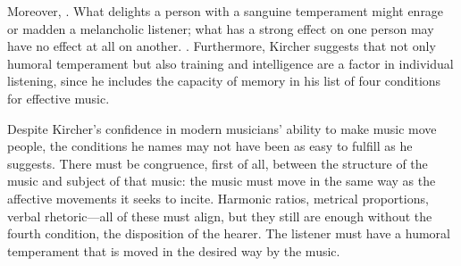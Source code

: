 Moreover, .
\Autocite[544: .]{Kircher:Musurgia}
What delights a person with a sanguine temperament might enrage or madden a melancholic listener; what has a strong effect on one person may have no effect at all on another.
\Autocite[550]{Kircher:Musurgia}
.
\Autocite[550: .]{Kircher:Musurgia}
Furthermore, Kircher suggests that not only humoral temperament but also training and intelligence are a factor in individual listening, since he includes the capacity of memory in his list of four conditions for effective music.

Despite Kircher's confidence in modern musicians' ability to make music move people, the conditions he names may not have been as easy to fulfill as he suggests.
There must be congruence, first of all, between the structure of the music and subject of that music: the music must move in the same way as the affective movements it seeks to incite.
Harmonic ratios, metrical proportions, verbal rhetoric---all of these must align, but they still are enough without the fourth condition, the disposition of the hearer.
The listener must have a humoral temperament that is moved in the desired way by the music.

